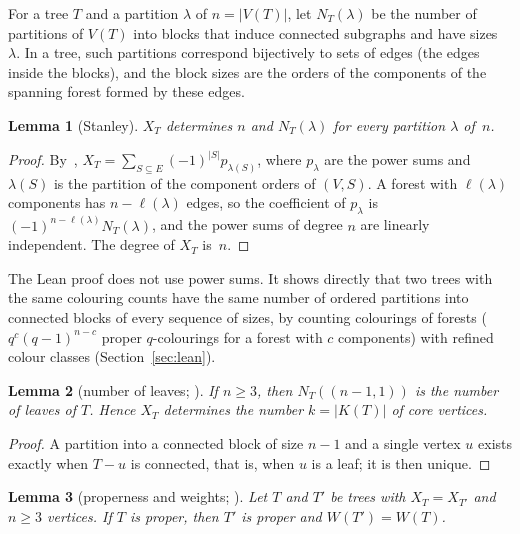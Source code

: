 \documentclass[11pt]{article}
\newtheorem{lemma}{Lemma}
\theoremstyle{definition}
\theoremstyle{remark}
\begin{document}
For a tree $T$ and a partition $\lambda$ of $n=|V(T)|$, let $N_T(\lambda)$ be the
number of partitions of $V(T)$ into blocks that induce connected subgraphs and
have sizes~$\lambda$. In a tree, such partitions correspond bijectively to sets
of edges (the edges inside the blocks), and the block sizes are the orders of
the components of the spanning forest formed by these edges.

\begin{lemma}[Stanley]\label{lem:stanley}
$X_T$ determines $n$ and $N_T(\lambda)$ for every partition $\lambda$ of~$n$.
\end{lemma}

\begin{proof}
By~\cite[Theorem~2.5]{stanley}, $X_T=\sum_{S\subseteq E}(-1)^{|S|}p_{\lambda(S)}$,
where $p_\lambda$ are the power sums and $\lambda(S)$ is the partition of the
component orders of $(V,S)$. A forest with $\ell(\lambda)$ components has
$n-\ell(\lambda)$ edges, so the coefficient of $p_\lambda$ is
$(-1)^{n-\ell(\lambda)}N_T(\lambda)$, and the power sums of degree $n$ are
linearly independent. The degree of $X_T$ is~$n$.
\end{proof}

\noindent The Lean proof does not use power sums. It shows directly that two
trees with the same colouring counts have the same number of ordered partitions
into connected blocks of every sequence of sizes, by counting colourings of
forests ($q^c(q-1)^{n-c}$ proper $q$-colourings for a forest with $c$
components) with refined colour classes (Section~\ref{sec:lean}).

\begin{lemma}[number of leaves; {\cite[Proposition~2(v)]{mmw}}]\label{lem:leaves}
If $n\ge3$, then $N_T((n-1,1))$ is the number of leaves of $T$. Hence $X_T$
determines the number $k=|K(T)|$ of core vertices.
\end{lemma}

\begin{proof}
A partition into a connected block of size $n-1$ and a single vertex $u$ exists
exactly when $T-u$ is connected, that is, when $u$ is a leaf; it is then unique.
\end{proof}

\begin{lemma}[properness and weights; {\cite[Theorem~4.15, Corollary~4.20]{got}}]\label{lem:weights}
Let $T$ and $T'$ be trees with $X_T=X_{T'}$ and $n\ge3$ vertices. If $T$ is
proper, then $T'$ is proper and $W(T')=W(T)$.
\end{lemma}
\end{document}
